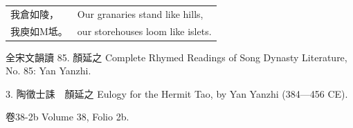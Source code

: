 \begin{longtable}{p{} p{}}
我倉如陵， &
Our granaries stand like hills,\\

我庾如M坻。
&
our storehouses loom like islets.\\









\end{longtable}








全宋文韻讀 85. 顏延之
Complete Rhymed Readings of Song Dynasty Literature, No. 85: Yan Yanzhi.

3. 陶徵士誄　顏延之
Eulogy for the Hermit Tao, by Yan Yanzhi (384—456 CE).

卷38-2b
Volume 38, Folio 2b.



